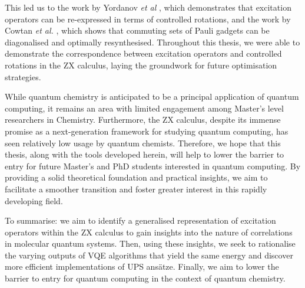 This led us to the work by Yordanov \textit{et al} \cite{Yordanov2020}, which demonstrates that excitation operators can be re-expressed in terms of controlled rotations, and the work by Cowtan \textit{et al.} \cite{Cowtan2020}, which shows that commuting sets of Pauli gadgets can be diagonalised and optimally resynthesised. Throughout this thesis, we were able to demonstrate the correspondence between excitation operators and controlled rotations in the ZX calculus, laying the groundwork for future optimisation strategies.

While quantum chemistry is anticipated to be a principal application of quantum computing, it remains an area with limited engagement among Master's level researchers in Chemistry. Furthermore, the ZX calculus, despite its immense promise as a next-generation framework for studying quantum computing, has seen relatively low usage by quantum chemists. Therefore, we hope that this thesis, along with the tools developed herein, will help to lower the barrier to entry for future Master's and PhD students interested in quantum computing. By providing a solid theoretical foundation and practical insights, we aim to facilitate a smoother transition and foster greater interest in this rapidly developing field.

To summarise: we aim to identify a generalised representation of excitation operators within the ZX calculus to gain insights into the nature of correlations in molecular quantum systems. Then, using these insights, we seek to rationalise the varying outputs of VQE algorithms that yield the same energy and discover more efficient implementations of UPS ansätze. Finally, we aim to lower the barrier to entry for quantum computing in the context of quantum chemistry.
